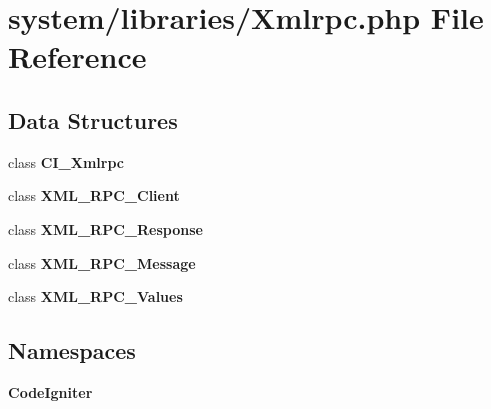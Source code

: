 \section{system/libraries/\-Xmlrpc.php File Reference}
\label{_xmlrpc_8php}
\subsection*{Data Structures}
\begin{DoxyCompactItemize}
\item 
class {\bf C\-I\-\_\-\-Xmlrpc}
\item 
class {\bf X\-M\-L\-\_\-\-R\-P\-C\-\_\-\-Client}
\item 
class {\bf X\-M\-L\-\_\-\-R\-P\-C\-\_\-\-Response}
\item 
class {\bf X\-M\-L\-\_\-\-R\-P\-C\-\_\-\-Message}
\item 
class {\bf X\-M\-L\-\_\-\-R\-P\-C\-\_\-\-Values}
\end{DoxyCompactItemize}
\subsection*{Namespaces}
\begin{DoxyCompactItemize}
\item 
{\bf Code\-Igniter}
\end{DoxyCompactItemize}
